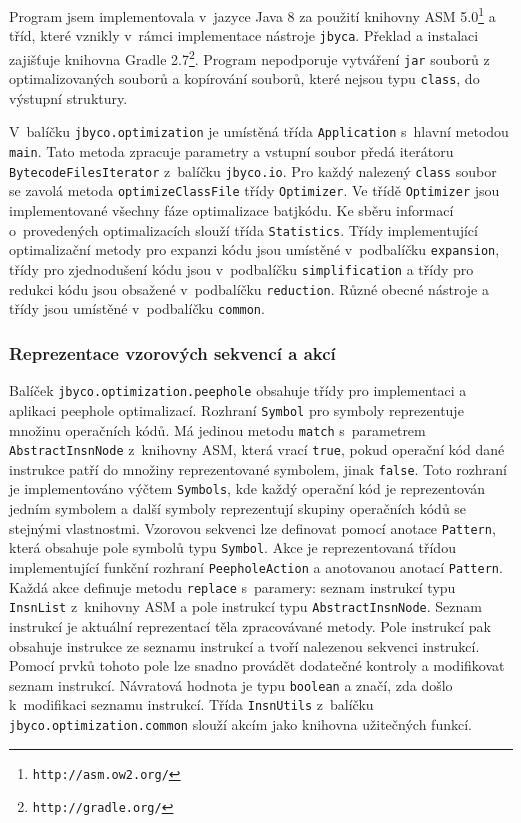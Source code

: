 Program jsem implementovala v~jazyce Java 8 za použití knihovny ASM 5.0\footnote{\texttt{http://asm.ow2.org/}} a tříd, které vznikly v~rámci implementace nástroje \texttt{jbyca}. Překlad a instalaci zajišťuje knihovna Gradle 2.7\footnote{\texttt{http://gradle.org/}}. Program nepodporuje vytváření \texttt{jar} souborů z optimalizovaných souborů a kopírování souborů, které nejsou typu \texttt{class}, do výstupní struktury.

V~balíčku \texttt{jbyco.optimization} je umístěná třída \texttt{Application} s~hlavní metodou \texttt{main}. Tato metoda zpracuje parametry a vstupní soubor předá iterátoru \texttt{BytecodeFilesIterator} z~balíčku \texttt{jbyco.io}. Pro každý nalezený \texttt{class} soubor se zavolá metoda \texttt{optimizeClassFile} třídy \texttt{Optimizer}. Ve třídě \texttt{Optimizer} jsou implementované všechny fáze optimalizace batjkódu. Ke sběru informací o~provedených optimalizacích slouží třída \texttt{Statistics}. Třídy implementující optimalizační metody pro expanzi kódu jsou umístěné v~podbalíčku \texttt{expansion}, třídy pro zjednodušení kódu jsou v~podbalíčku \texttt{simplification} a třídy pro redukci kódu jsou obsažené v~podbalíčku \texttt{reduction}. Různé obecné nástroje a třídy jsou umístěné v~podbalíčku \texttt{common}. 

\subsubsection{Reprezentace vzorových sekvencí a akcí}

Balíček \texttt{jbyco.optimization.peephole} obsahuje třídy pro implementaci a aplikaci peephole optimalizací. Rozhraní \texttt{Symbol} pro symboly reprezentuje množinu operačních kódů. Má jedinou metodu \texttt{match} s~parametrem \texttt{AbstractInsnNode} z~knihovny ASM, která vrací \texttt{true}, pokud operační kód dané instrukce patří do množiny reprezentované symbolem, jinak \texttt{false}. Toto rozhraní je implementováno výčtem \texttt{Symbols}, kde každý operační kód je reprezentován jedním symbolem a další symboly reprezentují skupiny operačních kódů se stejnými vlastnostmi. Vzorovou sekvenci lze definovat pomocí anotace \texttt{Pattern}, která obsahuje pole symbolů typu \texttt{Symbol}. Akce je reprezentovaná třídou implementující funkční rozhraní \texttt{PeepholeAction} a anotovanou anotací \texttt{Pattern}. Každá akce definuje metodu \texttt{replace} s~paramery: seznam instrukcí typu \texttt{InsnList} z~knihovny ASM a pole instrukcí typu \texttt{AbstractInsnNode}. Seznam instrukcí je aktuální reprezentací těla zpracovávané metody. Pole instrukcí pak obsahuje instrukce ze seznamu instrukcí a tvoří nalezenou sekvenci instrukcí. Pomocí prvků tohoto pole lze snadno provádět dodatečné kontroly a modifikovat seznam instrukcí. Návratová hodnota je typu \texttt{boolean} a značí, zda došlo k~modifikaci seznamu instrukcí. Třída \texttt{InsnUtils} z~balíčku \texttt{jbyco.optimization.common} slouží akcím jako knihovna užitečných funkcí.

